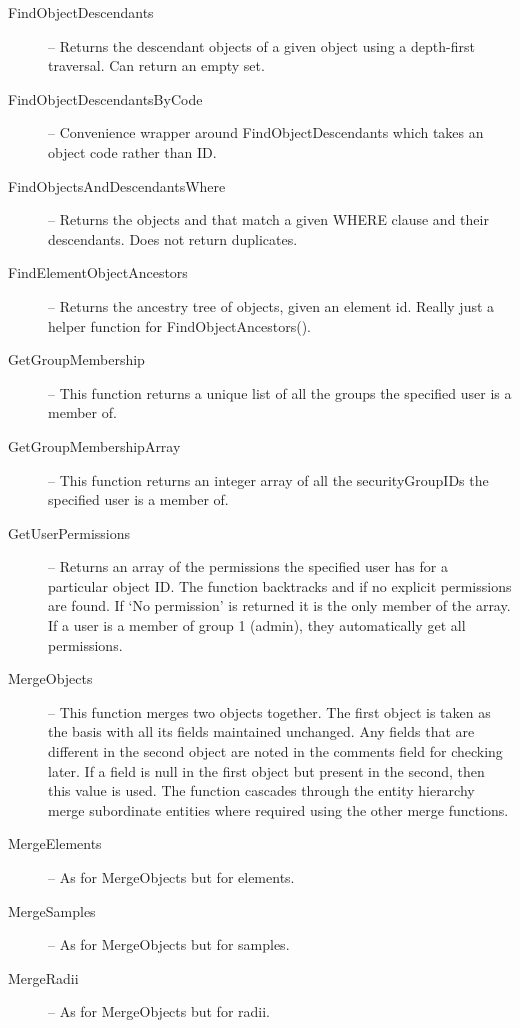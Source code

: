 \begin{description}
 \item[FindObjectDescendants] -- Returns the descendant objects of a given object using a depth-first traversal. Can return an empty set. 

 \item[FindObjectDescendantsByCode] -- Convenience wrapper around FindObjectDescendants which takes an object code rather than ID.

 \item[FindObjectsAndDescendantsWhere] -- Returns the objects and that match a given WHERE clause and their descendants. Does not return duplicates. 

 \item[FindElementObjectAncestors] -- Returns the ancestry tree of objects, given an element id. Really just a helper function for FindObjectAncestors(). 

 \item[GetGroupMembership] -- This function returns a unique list of all the groups the specified user is a member of. 

 \item[GetGroupMembershipArray] -- This function returns an integer array of all the securityGroupIDs the specified user is a member of. 

 \item[GetUserPermissions] -- Returns an array of the permissions the specified user has for a particular object ID. The function backtracks  and  if no explicit permissions are found. If `No permission' is returned it is the only member of the array. If a user is a member of group 1 (admin), they automatically get all permissions. 

 \item[MergeObjects] -- This function merges two objects together. The first object is taken as the basis with all its fields maintained unchanged. Any fields that are different in the second object are noted in the comments field for checking later. If a field is null in the first object but present in the second, then this value is used. The function cascades through the entity hierarchy merge subordinate entities where required using the other merge functions. 

 \item[MergeElements] -- As for MergeObjects but for elements.

 \item[MergeSamples] -- As for MergeObjects but for samples.

 \item[MergeRadii] -- As for MergeObjects but for radii.

\end{description}